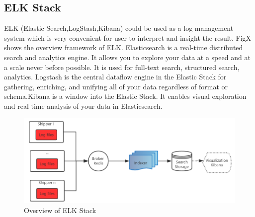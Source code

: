 \subsection{ELK Stack}
ELK (Elastic Search,LogStash,Kibana) could be used as a log management system which is very convenient for user to interpret and insight the result. FigX shows the overview framework of ELK. 
Elasticsearch is a real-time distributed search and analytics engine. It allows you to explore your data at a speed and at a scale never before possible. It is used for full-text search, structured search, analytics\cite{ELKIntro2017}. Logstash is the central dataflow engine in the Elastic Stack for gathering, enriching, and unifying all of your data regardless of format or schema\cite{ELKIntro2017}.Kibana is a window into the Elastic Stack. It enables visual exploration and real-time analysis of your data in Elasticsearch\cite{ELKIntro2017}.
\begin{figure}[!h]
\includegraphics[scale=0.5]{./figures/Fig2.png} 
\caption{Overview of ELK Stack}
\end{figure}

